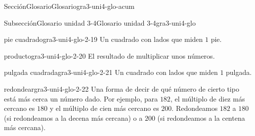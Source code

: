 \documentclass[twoside,10pt,]{article}
\begin{document}
\begin{sectionptx}{Sección}{Glosario}{}{Glosario}{}{}{gra3-uni4-glo-acum}
\begin{subsectionptx}{Subsección}{Glosario unidad 3-4}{}{Glosario unidad 3-4}{}{}{gra3-uni4-glo}
\begin{descriptionlist}
\begin{dlimedium}{pie cuadrado}{gra3-uni4-glo-2-19}
Un cuadrado con lados que miden \(1\) pie.%
\end{dlimedium}%
\begin{dlimedium}{producto}{gra3-uni4-glo-2-20}%
El resultado de multiplicar unos números.%
\end{dlimedium}%
\begin{dlimedium}{pulgada cuadrada}{gra3-uni4-glo-2-21}%
Un cuadrado con lados que miden \(1\) pulgada.%
\end{dlimedium}%
\begin{dlimedium}{redondear}{gra3-uni4-glo-2-22}%
Una forma de decir de qué número de cierto tipo está más cerca un número dado. Por ejemplo, para \(182\), el múltiplo de diez más cercano es \(180\) y el múltiplo de cien más cercano es \(200\). Redondeamos \(182\) a \(180\) (si redondeamos a la decena más cercana) o a \(200\) (si redondeamos a la centena más cercana).%
\end{dlimedium}%
\end{descriptionlist}
\end{subsectionptx}
\end{sectionptx}
\end{document}

